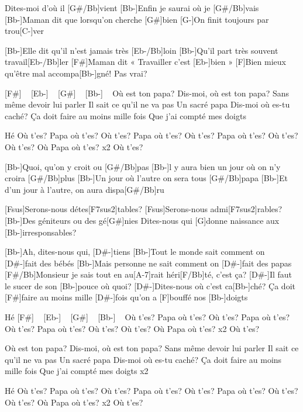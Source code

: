 
\begin{guitar}
[Bb-]Dites-moi d'où il [G#/Bb]vient
[Bb-]Enfin je saurai où je [G#/Bb]vais
[Bb-]Maman dit que lorsqu'on cherche [G#]bien
[G-]On finit toujours par trou[C-]ver

[Bb-]Elle dit qu'il n'est jamais très [Eb-/Bb]loin
[Bb-]Qu'il part très souvent travail[Eb-/Bb]ler
[F#]Maman dit « Travailler c'est [Eb-]bien »
[F]Bien mieux qu'être mal accompa[Bb-]gné!
Pas vrai?

[F#] ~ [Eb-] ~ [G#] ~ [Bb-] ~
Où est ton papa?
Dis-moi, où est ton papa?
Sans même devoir lui parler
Il sait ce qu'il ne va pas
Un sacré papa
Dis-moi où es-tu caché?
Ça doit faire au moins mille fois
Que j'ai compté mes doigts

Hé
Où t'es? Papa où t'es?
Où t'es? Papa où t'es?
Où t'es? Papa où t'es?
Où t'es? Où t'es? Où Papa où t'es? x2
Où t'es?

[Bb-]Quoi, qu'on y croit ou [G#/Bb]pas
[Bb-]l y aura bien un jour où on n'y croira [G#/Bb]plus
[Bb-]Un jour où l'autre on sera tous [G#/Bb]papa
[Bb-]Et d'un jour à l'autre, on aura dispa[G#/Bb]ru

[Fsus]Serons-nous détes[F7sus2]tables?
[Fsus]Serons-nous admi[F7sus2]rables?
[Bb-]Des géniteurs ou des gé[G#]nies
Dites-nous qui [G]donne naissance aux [Bb-]irresponsables?

[Bb-]Ah, dites-nous qui, [D#-]tiens
[Bb-]Tout le monde sait comment on [D#-]fait des bébés
[Bb-]Mais personne ne sait comment on [D#-]fait des papas
[F#/Bb]Monsieur je sais tout en au[A-7]rait héri[F/Bb]té, c'est ça?
[D#-]Il faut le sucer de son [Bb-]pouce où quoi?
[D#-]Dites-nous où c'est ca[Bb-]ché?
Ça doit [F#]faire au moins mille [D#-]fois qu'on a 
[F]bouffé nos [Bb-]doigts

Hé
[F#] ~ [Eb-] ~ [G#] ~ [Bb-] ~
Où t'es? Papa où t'es?
Où t'es? Papa où t'es?
Où t'es? Papa où t'es?
Où t'es? Où t'es? Où Papa où t'es? x2
Où t'es?

Où est ton papa?
Dis-moi, où est ton papa?
Sans même devoir lui parler
Il sait ce qu'il ne va pas
Un sacré papa
Dis-moi où es-tu caché?
Ça doit faire au moins mille fois
Que j'ai compté mes doigts x2


Hé
Où t'es? Papa où t'es?
Où t'es? Papa où t'es?
Où t'es? Papa où t'es?
Où t'es? Où t'es? Où Papa où t'es? x2
Où t'es?
\end{guitar}